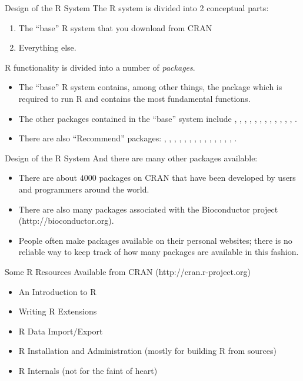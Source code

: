 \documentclass[aspectratio=169]{beamer}
\begin{document}
\begin{frame}{Design of the R System}
The R system is divided into 2 conceptual parts:
\begin{enumerate}
\item
The ``base'' R system that you download from CRAN
\item
Everything else.
\end{enumerate}
R functionality is divided into a number of \textit{packages}.
\begin{itemize}
\item
The ``base'' R system contains, among other things, the 
package which is required to run R and contains the most fundamental
functions.
\item
The other packages contained in the ``base'' system include
, , , ,
, , , ,
, , , ,
.
\item
There are also ``Recommend'' packages: , ,
, , , ,
, , , , ,
, , , .
\end{itemize}
\end{frame}




\begin{frame}{Design of the R System}
And there are many other packages available:
\begin{itemize}
\item
There are about $4000$ packages on CRAN that have been developed by
users and programmers around the world.
\item
There are also many packages associated with the Bioconductor project
(http://bioconductor.org).
\item
People often make packages available on their personal websites; there
is no reliable way to keep track of how many packages are available in
this fashion.
\end{itemize}
\end{frame}

\begin{frame}{Some R Resources}
Available from CRAN (http://cran.r-project.org)
\begin{itemize}
\item
An Introduction to R
\item
Writing R Extensions
\item
R Data Import/Export
\item
R Installation and Administration (mostly for building R from sources)
\item
R Internals (not for the faint of heart)
\end{itemize}
\end{frame}
\end{document}
